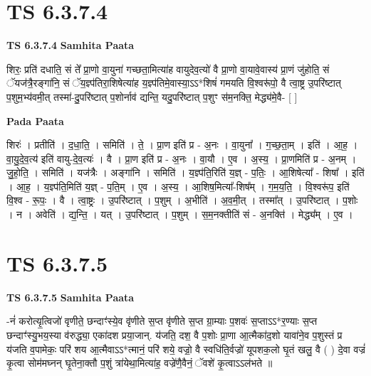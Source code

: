 \documentclass[17pt]{extarticle}
\begin{document}

\section{ TS 6.3.7.4 }

\textbf{TS 6.3.7.4 } \newline
\textbf{Samhita Paata} \newline

शिरः॒ प्रति॑ दधाति॒ सं ते᳚ प्रा॒णो वा॒युना॑ गच्छता॒मित्या॑ह वायुदेव॒त्यो॑ वै प्रा॒णो वा॒यावे॒वास्य॑ प्रा॒णं जु॑होति॒ सं ॅयज॑त्रै॒रङ्गा॑नि॒ सं ॅय॒ज्ञ्प॑तिरा॒शिषेत्या॑ह य॒ज्ञ्प॑तिमे॒वास्या॒ऽऽ*शिषं॑ गमयति वि॒श्वरू॑पो॒ वै त्वा॒ष्ट्र उ॒परि॑ष्टात् प॒शुम॒भ्य॑वमी॒त् तस्मा॑-दु॒परि॑ष्टात् प॒शोर्नाव॑ द्यन्ति॒ यदु॒परि॑ष्टात् प॒शुꣳ स॑म॒नक्ति॒ मेद्ध्य॑मे॒वै- [  ] \newline

\textbf{Pada Paata} \newline

शिरः॑ । प्रतीति॑ । द॒धा॒ति॒ । समिति॑ । ते॒ । प्रा॒ण इति॑ प्र - अ॒नः । वा॒युना᳚ । ग॒च्छ॒ता॒म् । इति॑ । आ॒ह॒ । वा॒यु॒दे॒व॒त्य॑ इति॑ वायु-दे॒व॒त्यः॑ । वै । प्रा॒ण इति॑ प्र - अ॒नः । वा॒यौ । ए॒व । अ॒स्य॒ । प्रा॒णमिति॑ प्र - अ॒नम् । जु॒हो॒ति॒ । समिति॑ । यज॑त्रैः । अङ्गा॑नि । समिति॑ । य॒ज्ञ्प॑ति॒रिति॑ य॒ज्ञ् - प॒तिः॒ । आ॒शिषेत्या᳚ - शिषा᳚ । इति॑ । आ॒ह॒ । य॒ज्ञ्प॑ति॒मिति॑ य॒ज्ञ् - प॒ति॒म् । ए॒व । अ॒स्य॒ । आ॒शिष॒मित्या᳚-शिष᳚म् । ग॒म॒य॒ति॒ । वि॒श्वरू॑प॒ इति॑ वि॒श्व - रू॒पः॒ । वै । त्वा॒ष्ट्रः । उ॒परि॑ष्टात् । प॒शुम् । अ॒भीति॑ । अ॒व॒मी॒त् । तस्मा᳚त् । उ॒परि॑ष्टात् । प॒शोः । न । अवेति॑ । द्य॒न्ति॒ । यत् । उ॒परि॑ष्टात् । प॒शुम् । स॒म॒नक्तीति॑ सं - अ॒नक्ति॑ । मेद्ध्य᳚म् । ए॒व ।  \newline





\section{ TS 6.3.7.5 }

\textbf{TS 6.3.7.5 } \newline
\textbf{Samhita Paata} \newline

-नं॑ करोत्यृ॒त्विजो॑ वृणीते॒ छन्दाꣳ॑स्ये॒व वृ॑णीते स॒प्त वृ॑णीते स॒प्त ग्रा॒म्याः प॒शवः॑ स॒प्ताऽऽ*र॒ण्याः स॒प्त छन्दाꣳ॑स्यु॒भय॒स्या व॑रुद्ध्या॒ एका॑दश प्रया॒जान्. य॑जति॒ दश॒ वै प॒शोः प्रा॒णा आ॒त्मैका॑द॒शो यावा॑ने॒व प॒शुस्तं प्र य॑जति व॒पामेकः॒ परि॑ शय आ॒त्मैवाऽऽ*त्मानं॒ परि॑ शये॒ वज्रो॒ वै स्वधि॑ति॒र्वज्रो॑ यूपशक॒लो घृ॒तं खलु॒ वै ( )  दे॒वा वज्रं॑ कृ॒त्वा सोम॑मघ्नन् घृ॒तेना॒क्तौ प॒शुं त्रा॑येथा॒मित्या॑ह॒ वज्रे॑णै॒वैनं॒ ॅवशे॑ कृ॒त्वाऽऽल॑भते ॥ \newline
\end{document}
